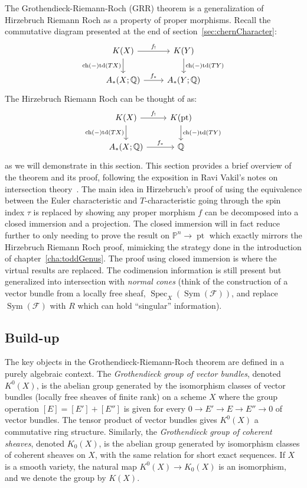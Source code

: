 \documentclass{book}
\newcommand{\Q}{{\mathbb{Q}}}
\renewcommand{\P}{{\mathbb{P}}}
\newcommand{\CF}{{\mathcal{F}}}
\newcommand{\ch}{{\operatorname{ch}}}
\newcommand{\Sym}{\operatorname{Sym}}
\newcommand{\Spec}{{\operatorname{Spec}}}
\newcommand{\td}{{\operatorname{td}}}
\renewcommand{\ch}{{\operatorname{ch}}}
\begin{document}
The Grothendieck-Riemann-Roch (GRR) theorem is a generalization of Hirzebruch Riemann Roch as a property of
proper morphisms. Recall the commutative diagram presented at the end of section~\ref{sec:chernCharacter}:
\[
\begin{tikzcd}
K(X) \arrow[r, "f_!"] \arrow[d, "\ch(-)\td(TX)"'] & K(Y) \arrow[d, "\ch(-)\td(TY)"] \\
A_*(X; \Q) \arrow[r, "f_*"]             & A_*(Y; \Q)
\end{tikzcd}
\]
The Hirzebruch Riemann Roch can be thought of as:
\[
\begin{tikzcd}
  K(X) \arrow[r, "f_!"] \arrow[d, "\ch(-)\td(TX)"'] & K(\operatorname{pt}) \arrow[d, "\ch(-)\td(TY)"] \\
A_*(X; \Q) \arrow[r, "f_*"]             & \Q
\end{tikzcd}
\]
as we will demonstrate in this section. This section provides a brief overview of the theorem and its proof,
following the exposition in Ravi Vakil's notes on intersection theory~\cite{vakilIntersectionTheory}. The main
idea in Hirzebruch's proof of using the equivalence between the Euler characteristic and $T$-characteristic
going through the spin index $\tau$ is replaced by showing any proper morphism $f$ can be decomposed into a
closed immersion and a projection. The closed immersion will in fact reduce further to only needing to prove
the result on $\P^n \to \operatorname{pt}$ which exactly mirrors the Hirzebruch Riemann Roch proof, mimicking
the strategy done in the introduction of chapter~\cref{cha:toddGenus}. The proof using closed immersion is
where the virtual results are replaced. The codimension information is still present but generalized
into intersection with \emph{normal cones} (think of the construction of a vector bundle from a locally free
sheaf, $\Spec_X(\Sym(\CF))$, and replace $\Sym(\CF)$ with $R$ which can hold ``singular'' information).


\subsection*{Build-up}

The key objects in the Grothendieck-Riemann-Roch theorem are defined in a purely algebraic context. The
\emph{Grothendieck group of vector bundles}, denoted $K^0(X)$, is the abelian group generated by the
isomorphism classes of vector bundles (locally free sheaves of finite rank) on a scheme $X$ where the group
operation $[E] = [E'] + [E'']$ is given for every $0 \to E' \to E \to E'' \to 0$ of vector
bundles. The tensor product of vector bundles gives $K^0(X)$ a commutative ring structure. Similarly, the
\emph{Grothendieck group of coherent sheaves}, denoted $K_0(X)$, is the abelian group generated by
isomorphism classes of coherent sheaves on $X$, with the same relation for short exact sequences. If $X$ is a
smooth variety, the natural map $K^0(X) \to K_0(X)$ is an isomorphism, and we denote the group by $K(X)$.
\end{document}
